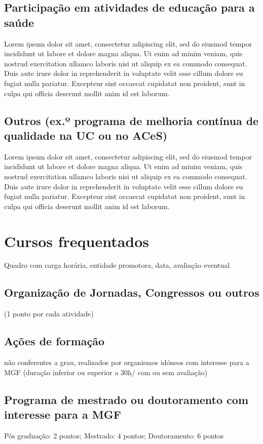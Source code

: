 \documentclass{report}
\begin{document}
\subsection{Participação em atividades de educação para a saúde}
Lorem ipsum dolor sit amet, consectetur adipiscing elit, sed do eiusmod tempor incididunt ut labore et dolore magna aliqua. Ut enim ad minim veniam, quis nostrud exercitation ullamco laboris nisi ut aliquip ex ea commodo consequat. Duis aute irure dolor in reprehenderit in voluptate velit esse cillum dolore eu fugiat nulla pariatur. Excepteur sint occaecat cupidatat non proident, sunt in culpa qui officia deserunt mollit anim id est laborum.
\subsection{Outros (ex.º programa de melhoria contínua de qualidade na UC ou no ACeS)}
Lorem ipsum dolor sit amet, consectetur adipiscing elit, sed do eiusmod tempor incididunt ut labore et dolore magna aliqua. Ut enim ad minim veniam, quis nostrud exercitation ullamco laboris nisi ut aliquip ex ea commodo consequat. Duis aute irure dolor in reprehenderit in voluptate velit esse cillum dolore eu fugiat nulla pariatur. Excepteur sint occaecat cupidatat non proident, sunt in culpa qui officia deserunt mollit anim id est laborum.

\section{Cursos frequentados}
Quadro com carga horária, entidade promotora, data, avaliação eventual
\subsection{Organização de Jornadas, Congressos ou outros}
(1 ponto por cada atividade)

\subsection{Ações de formação}
não conferentes a grau, realizados por organismos idóneos com interesse para a MGF (duração inferior ou superior a 30h/ com ou sem avaliação)

\subsection{Programa de mestrado ou doutoramento com interesse para a MGF}
Pós graduação: 2 pontos; Mestrado: 4 pontos; Doutoramento: 6 pontos
\end{document}
